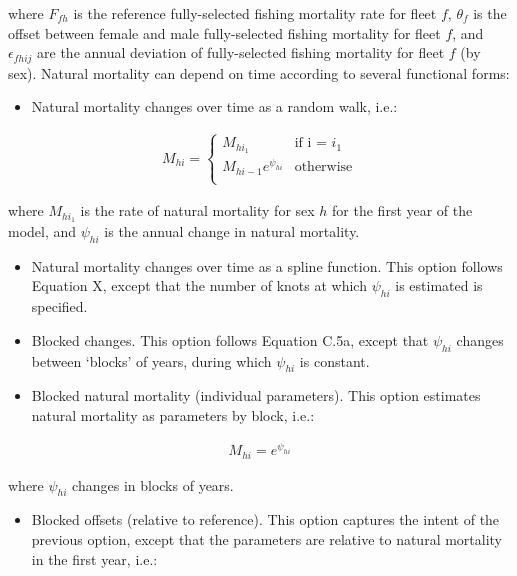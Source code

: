 \documentclass[]{article}
\providecommand{\tightlist}{%
  \setlength{\itemsep}{0pt}\setlength{\parskip}{0pt}}
\begin{document}
where \(F_{fh}\) is the reference fully-selected fishing mortality rate
for fleet \(f\), \(\theta_{f}\) is the offset between female and male
fully-selected fishing mortality for fleet \(f\), and
\(\epsilon_{fhij}\) are the annual deviation of fully-selected fishing
mortality for fleet \(f\) (by sex). Natural mortality can depend on time
according to several functional forms:

\begin{itemize}
\tightlist
\item
  Natural mortality changes over time as a random walk, i.e.:
\end{itemize}

\begin{align}
 M_{hi} = 
  \begin{cases}
    M_{hi_{1}} & \text{if i = $i_{1}$ } \\[2ex]
    M_{hi-1}e^{\psi_{hi}} & \text{otherwise} \\
    \end{cases}
    \end{align}

where \(M_{hi_{1}}\) is the rate of natural mortality for sex \(h\) for
the first year of the model, and \(\psi_{hi}\) is the annual change in
natural mortality.

\begin{itemize}
\tightlist
\item
  Natural mortality changes over time as a spline function. This option
  follows Equation X, except that the number of knots at which
  \(\psi_{hi}\) is estimated is specified.\\
\item
  Blocked changes. This option follows Equation C.5a, except that
  \(\psi_{hi}\) changes between `blocks' of years, during which
  \(\psi_{hi}\) is constant.\\
\item
  Blocked natural mortality (individual parameters). This option
  estimates natural mortality as parameters by block, i.e.:
\end{itemize}

\begin{align}
          M_{hi} = e^{\psi_{hi}}
\end{align}

where \(\psi_{hi}\) changes in blocks of years.

\begin{itemize}
\tightlist
\item
  Blocked offsets (relative to reference). This option captures the
  intent of the previous option, except that the parameters are relative
  to natural mortality in the first year, i.e.:
\end{itemize}
\end{document}
